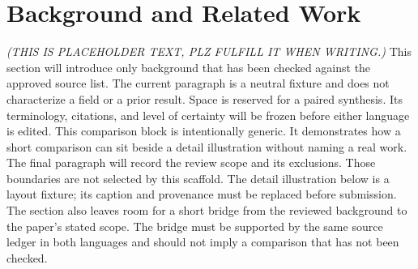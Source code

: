 \section{Background and Related Work}\label{sec:background-related-work}
\textit{(THIS IS PLACEHOLDER TEXT, PLZ FULFILL IT WHEN WRITING.)}
This section will introduce only background that has been checked against the approved source list. The current paragraph is a neutral fixture and does not characterize a field or a prior result.
Space is reserved for a paired synthesis. Its terminology, citations, and level of certainty will be frozen before either language is edited.
This comparison block is intentionally generic. It demonstrates how a short comparison can sit beside a detail illustration without naming a real work.
The final paragraph will record the review scope and its exclusions. Those boundaries are not selected by this scaffold.
The detail illustration below is a layout fixture; its caption and provenance must be replaced before submission.
The section also leaves room for a short bridge from the reviewed background to the paper's stated scope. The bridge must be supported by the same source ledger in both languages and should not imply a comparison that has not been checked.


